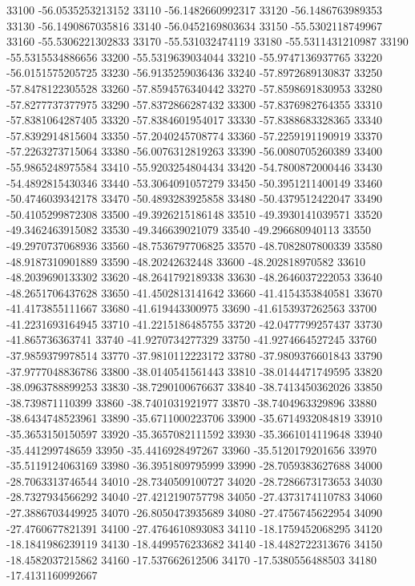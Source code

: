 {33100 -56.0535253213152
33110 -56.1482660992317
33120 -56.1486763989353
33130 -56.1490867035816
33140 -56.0452169803634
33150 -55.5302118749967
33160 -55.5306221302833
33170 -55.531032474119
33180 -55.5311431210987
33190 -55.5315534886656
33200 -55.5319639034044
33210 -55.9747136937765
33220 -56.0151575205725
33230 -56.9135259036436
33240 -57.8972689130837
33250 -57.8478122305528
33260 -57.8594576340442
33270 -57.8598691830953
33280 -57.8277737377975
33290 -57.8372866287432
33300 -57.8376982764355
33310 -57.8381064287405
33320 -57.8384601954017
33330 -57.8388683328365
33340 -57.8392914815604
33350 -57.2040245708774
33360 -57.2259191190919
33370 -57.2263273715064
33380 -56.0076312819263
33390 -56.0080705260389
33400 -55.9865248975584
33410 -55.9203254804434
33420 -54.7800872000446
33430 -54.4892815430346
33440 -53.3064091057279
33450 -50.3951211400149
33460 -50.4746039342178
33470 -50.4893283925858
33480 -50.4379512422047
33490 -50.4105299872308
33500 -49.3926215186148
33510 -49.3930141039571
33520 -49.3462463915082
33530 -49.346639021079
33540 -49.296680940113
33550 -49.2970737068936
33560 -48.7536797706825
33570 -48.7082807800339
33580 -48.9187310901889
33590 -48.20242632448
33600 -48.202818970582
33610 -48.2039690133302
33620 -48.2641792189338
33630 -48.2646037222053
33640 -48.2651706437628
33650 -41.4502813141642
33660 -41.4154353840581
33670 -41.4173855111667
33680 -41.619443300975
33690 -41.6153937262563
33700 -41.2231693164945
33710 -41.2215186485755
33720 -42.0477799257437
33730 -41.865736363741
33740 -41.9270734277329
33750 -41.9274664527245
33760 -37.9859379978514
33770 -37.9810112223172
33780 -37.9809376601843
33790 -37.9777048836786
33800 -38.0140541561443
33810 -38.0144471749595
33820 -38.0963788899253
33830 -38.7290100676637
33840 -38.7413450362026
33850 -38.739871110399
33860 -38.7401031921977
33870 -38.7404963329896
33880 -38.6434748523961
33890 -35.6711000223706
33900 -35.6714932084819
33910 -35.3653150150597
33920 -35.3657082111592
33930 -35.3661014119648
33940 -35.441299748659
33950 -35.4416928497267
33960 -35.5120179201656
33970 -35.5119124063169
33980 -36.3951809795999
33990 -28.7059383627688
34000 -28.7063313746544
34010 -28.7340509100727
34020 -28.7286673173653
34030 -28.7327934566292
34040 -27.4212190757798
34050 -27.4373174110783
34060 -27.3886703449925
34070 -26.8050473935689
34080 -27.4756745622954
34090 -27.4760677821391
34100 -27.4764610893083
34110 -18.1759452068295
34120 -18.1841986239119
34130 -18.4499576233682
34140 -18.4482722313676
34150 -18.4582037215862
34160 -17.537662612506
34170 -17.5380556488503
34180 -17.4131160992667
}
